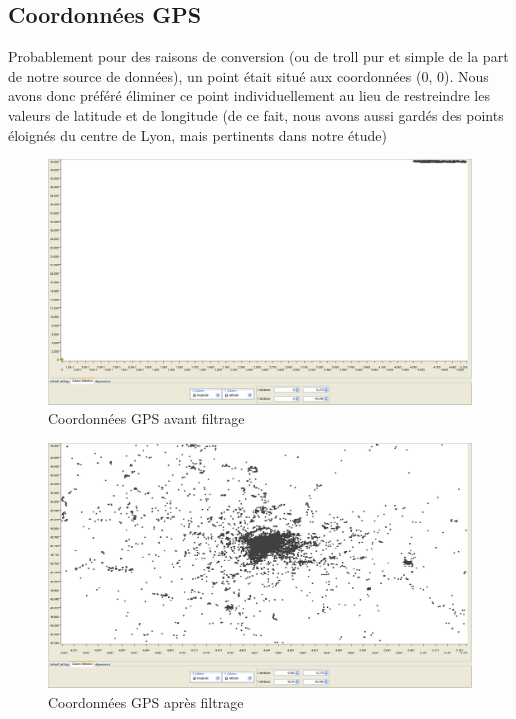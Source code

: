     \pagebreak
    \subsection{Coordonnées GPS}

        Probablement pour des raisons de conversion (ou de troll pur et simple de la part de notre source de données),
        un point était situé aux coordonnées (0, 0). Nous avons donc préféré éliminer ce point individuellement au lieu
        de restreindre les valeurs de latitude et de longitude (de ce fait, nous avons aussi gardés des points éloignés
        du centre de Lyon, mais pertinents dans notre étude)

        \begin{figure}[h]
            \centering
            \includegraphics[scale=0.22]{../screenshots/geographic_before.png}
            \caption{Coordonnées GPS avant filtrage}
            \label{diagram:geographic_before}
        \end{figure}

        \begin{figure}[h]
            \centering
            \includegraphics[scale=0.22]{../screenshots/geographic_after.png}
            \caption{Coordonnées GPS apr\`es filtrage}
            \label{diagram:geographic_after}
        \end{figure}
